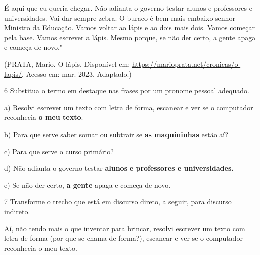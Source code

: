 {É aqui que eu queria chegar. Não adianta o governo testar alunos e
professores e universidades. Vai dar sempre zebra. O buraco é bem mais
embaixo senhor Ministro da Educação. Vamos voltar ao lápis e ao dois
mais dois. Vamos começar pela base. Vamos escrever a lápis. Mesmo
porque, se não der certo, a gente apaga e começa de novo."

(PRATA, Mario. O lápis. Disponível em:
\url{https://marioprata.net/cronicas/o-lapis/}. Acesso em: mar. 2023.
Adaptado.)

\num{6} Substitua o termo em destaque nas frases por um pronome pessoal
adequado.

a) Resolvi escrever um texto com letra de forma, escanear e ver se o
computador reconhecia \textbf{o meu texto}.



b) Para que serve saber somar ou subtrair se \textbf{as maquininhas}
estão aí?



c) Para que serve o curso primário?



d) Não adianta o governo testar \textbf{alunos} \textbf{e professores e
universidades.}



e) Se não der certo, \textbf{a gente} apaga e começa de novo.



\num{7} Transforme o trecho que está em discurso direto, a seguir, para
discurso indireto.

Aí, não tendo mais o que inventar para brincar, resolvi escrever um
texto com letra de forma (por que se chama de forma?), escanear e ver se
o computador reconhecia o meu texto.



}
